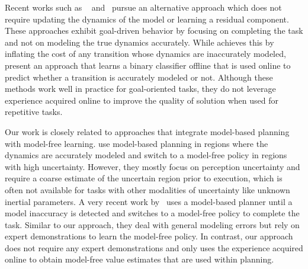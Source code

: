 Recent works such as \cmax{}~\cite{cmax}
and~\cite{DBLP:journals/ral/McConachiePMB20} pursue an alternative
approach which does not require updating the dynamics of the model or
learning a residual component. These approaches exhibit goal-driven
behavior by focusing on completing the task and not on modeling the
true dynamics accurately. While \cmax{} achieves this by inflating the
cost of any transition whose dynamics are inaccurately modeled,
\cite{DBLP:journals/ral/McConachiePMB20} present an approach that
learns a binary classifier offline that is used online to predict
whether a transition is accurately modeled or not. Although these
methods work well in practice for goal-oriented tasks, they do not
leverage experience acquired online to improve the quality of solution
when used for repetitive tasks.




Our work is closely related to approaches that integrate
model-based planning with model-free
learning. \cite{DBLP:journals/corr/abs-2005-10872} use model-based
planning in regions where the dynamics are accurately modeled and
switch to a model-free policy in regions with high
uncertainty. However, they mostly focus on perception uncertainty and
require a coarse estimate of the uncertain region prior to execution,
which is often not available for tasks with other modalities of
uncertainty like unknown inertial parameters. A very recent work
by~\cite{lagrassa2020learning} uses a
model-based planner until a model inaccuracy is detected and switches
to a model-free policy to complete the task. Similar to our approach,
they deal with general modeling errors but rely on expert
demonstrations to learn the model-free policy. In contrast, our
approach does not require any expert demonstrations and only uses the
experience acquired online to obtain model-free value estimates
that are used within planning.


